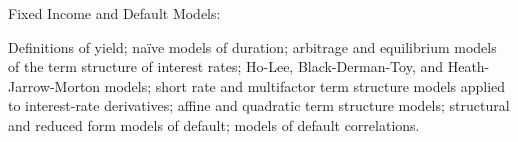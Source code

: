 Fixed Income and Default Models:
 
Definitions of yield;
naïve models of duration;
arbitrage and equilibrium models of the term structure of interest rates;
Ho-Lee, Black-Derman-Toy, and Heath-Jarrow-Morton models;
short rate and multifactor term structure models applied to interest-rate derivatives;
affine and quadratic term structure models;
structural and reduced form models of default;
models of default correlations.
